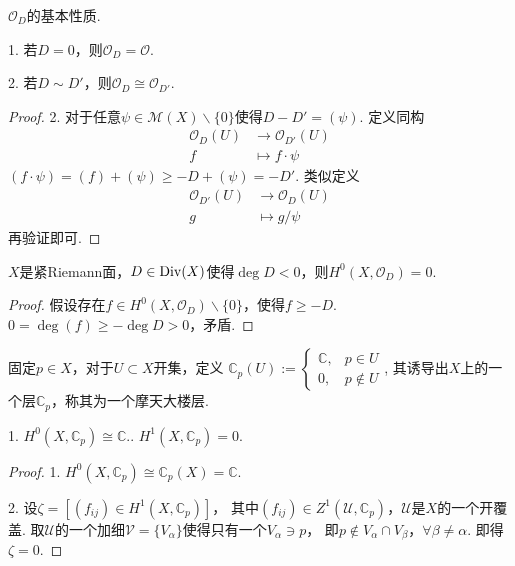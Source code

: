 \begin{proposition} $\mathcal{O}_D$的基本性质.

	1. 若$D=0$，则$\mathcal{O}_D=\mathcal{O}$.

	2. 若$D\sim D'$，则$\mathcal{O}_D \cong \mathcal{O}_{D'}$.
\end{proposition}

\begin{proof}
	2. 对于任意$\psi \in \mathscr{M}(X)\backslash \{0\}$使得$D-D'=(\psi)$. 定义同构
	\begin{align*}
	    \mathcal{O}_D(U) &\rightarrow \mathcal{O}_{D'}(U)\\
		f&\mapsto f\cdot \psi
	\end{align*}
	$(f\cdot \psi)=(f)+(\psi)\geq -D+(\psi)=-D'$. 类似定义
	\begin{align*}
		\mathcal{O}_{D'}(U) &\rightarrow \mathcal{O}_{D}(U)\\
		g&\mapsto g/\psi
	\end{align*}
	再验证即可.
\end{proof}
		
\begin{theorem}
	$X$是紧Riemann面，$D\in \operatorname{Div}(X)$使得$\deg D<0$，则$H^0(X, \mathcal{O}_D)=0$.
\end{theorem}
		
\begin{proof}
	假设存在$f\in H^0(X, \mathcal{O}_D)\backslash \{0\}$，使得$f\geq -D$. 
    $0=\deg(f)\geq -\deg D>0$，矛盾.
\end{proof}

\begin{definition}
	固定$p\in X$，对于$U\subset X$开集，定义
	$\mathbb{C}_p(U):=\begin{cases} \mathbb{C}, &p\in U\\ 0, &p\notin U\end{cases}$,
	其诱导出$X$上的一个层$\mathbb{C}_p$，称其为一个摩天大楼层.
\end{definition}
		
\begin{lemma}
	1. $H^0(X, \mathbb{C}_p)\cong \mathbb{C}$.. $H^1(X,\mathbb{C}_p)=0$.
\end{lemma}

\begin{proof}
	1. $H^0(X,\mathbb{C}_p)\cong \mathbb{C}_p(X)=\mathbb{C}$.

	2. 设$\zeta=[(f_{ij})\in H^1(X,\mathbb{C}_p)]$，
    其中$(f_{ij})\in Z^1(\mathscr{U},\mathbb{C}_p)$，$\mathscr{U}$是$X$的一个开覆盖. 
    取$\mathscr{U}$的一个加细$\mathscr{V}=\{V_\alpha\}$使得只有一个$V_\alpha \ni p$，
    即$p \notin V_\alpha\cap V_\beta$，$\forall \beta\neq \alpha$. 即得$\zeta=0$.
\end{proof}

